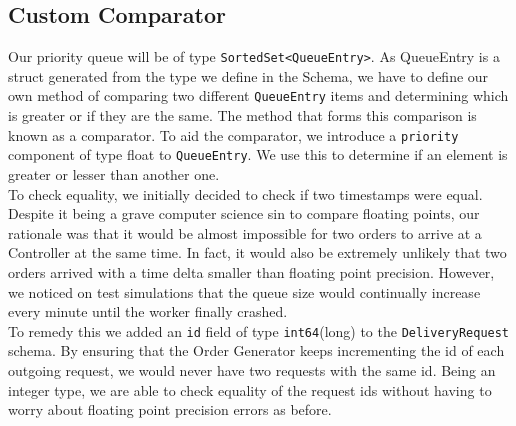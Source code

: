 \documentclass[a4paper,11pt,titlepage]{report}
\begin{document}
\subsection{Custom Comparator}
Our priority queue will be of type \texttt{SortedSet<QueueEntry>}. As QueueEntry is a struct generated from the type we define in the Schema, we have to define our own method of comparing two different \texttt{QueueEntry} items and determining which is greater or if they are the same. The method that forms this comparison is known as a comparator. To aid the comparator, we introduce a \texttt{priority} component of type float to \texttt{QueueEntry}. We use this to determine if an element is greater or lesser than another one.\\


To check equality, we initially decided to check if two timestamps were equal. Despite it being a grave computer science sin to compare floating points, our rationale was that it would be almost impossible for two orders to arrive at a Controller at the same time. In fact, it would also be extremely unlikely that two orders arrived with a time delta smaller than floating point precision. However, we noticed on test simulations that the queue size would continually increase every minute until the worker finally crashed.\\

To remedy this we added an \texttt{id} field of type \texttt{int64}(long) to the \texttt{DeliveryRequest} schema. By ensuring that the Order Generator keeps incrementing the id of each outgoing request, we would never have two requests with the same id. Being an integer type, we are able to check equality of the request ids without having to worry about floating point precision errors as before.\\

\end{document}
